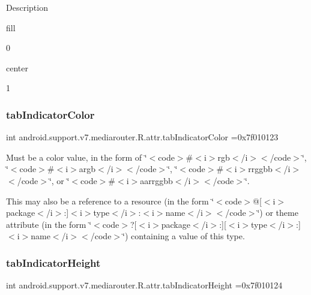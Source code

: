 Description 

{\ttfamily fill}

0

{\ttfamily center}

1\mbox{\label{classandroid_1_1support_1_1v7_1_1mediarouter_1_1R_1_1attr_a5fa8ac9760622b42329186cf71b2cee1}} 
\subsubsection{\texorpdfstring{tab\+Indicator\+Color}{tabIndicatorColor}}
{\footnotesize\ttfamily int android.\+support.\+v7.\+mediarouter.\+R.\+attr.\+tab\+Indicator\+Color =0x7f010123\hspace{0.3cm}{\ttfamily [static]}}

Must be a color value, in the form of \char`\"{}$<$code$>$\#$<$i$>$rgb$<$/i$>$$<$/code$>$\char`\"{}, \char`\"{}$<$code$>$\#$<$i$>$argb$<$/i$>$$<$/code$>$\char`\"{}, \char`\"{}$<$code$>$\#$<$i$>$rrggbb$<$/i$>$$<$/code$>$\char`\"{}, or \char`\"{}$<$code$>$\#$<$i$>$aarrggbb$<$/i$>$$<$/code$>$\char`\"{}. 

This may also be a reference to a resource (in the form \char`\"{}$<$code$>$@\mbox{[}$<$i$>$package$<$/i$>$\+:\mbox{]}$<$i$>$type$<$/i$>$\+:$<$i$>$name$<$/i$>$$<$/code$>$\char`\"{}) or theme attribute (in the form \char`\"{}$<$code$>$?\mbox{[}$<$i$>$package$<$/i$>$\+:\mbox{]}\mbox{[}$<$i$>$type$<$/i$>$\+:\mbox{]}$<$i$>$name$<$/i$>$$<$/code$>$\char`\"{}) containing a value of this type. \mbox{\label{classandroid_1_1support_1_1v7_1_1mediarouter_1_1R_1_1attr_a6e43238d9de23b53c1c96f5fae8205d7}} 
\subsubsection{\texorpdfstring{tab\+Indicator\+Height}{tabIndicatorHeight}}
{\footnotesize\ttfamily int android.\+support.\+v7.\+mediarouter.\+R.\+attr.\+tab\+Indicator\+Height =0x7f010124\hspace{0.3cm}{\ttfamily [static]}}

